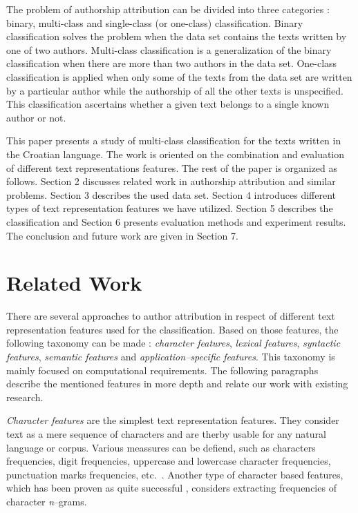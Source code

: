\documentclass{llncs}
\begin{document}
The problem of authorship attribution can be divided into three categories
\cite{zhao2005effective}: binary, multi-class and single-class (or one-class)
classification. Binary classification solves the problem when the data set
contains the texts written by one of two authors. Multi-class classification is a
generalization of the binary classification when there are more than two authors
in the data set. One-class classification is applied when only some of the texts
from the data set are written by a particular author while the authorship of all
the other texts is unspecified. This classification ascertains whether a given
text belongs to a single known author or not.

This paper presents a study of multi-class classification for the texts written
in the Croatian language. The work is oriented on the combination and evaluation of
different text representations features. The rest of the paper is organized as
follows. Section 2 discusses related work in authorship attribution and similar
problems. Section 3 describes the used data set. Section 4 introduces
different types of text representation features we have utilized. Section 5 describes
the classification and Section 6 presents evaluation methods and experiment results. The conclusion and
future work are given in Section 7.

\section{Related Work}
There are several approaches to author attribution in respect of different text
representation features used for the classification. Based on those features, the
following taxonomy can be made \cite{stamatatos2009survey}: \emph{character features},
\emph{lexical features}, \emph{syntactic features}, \emph{semantic features} and
\emph{application--specific features}. This taxonomy is mainly focused on computational requirements.
The following paragraphs describe the mentioned features in more depth and relate our work with existing research.

\emph{Character features} are the simplest text representation features. They
consider text as a mere sequence of characters and are therby usable for any natural
language or corpus. Various meassures can be defiend, such as
characters frequencies, digit frequencies, uppercase and lowercase character
frequencies, punctuation marks frequencies, etc.~\cite{de2001mining}. Another
type of character based features, which has been proven as quite successful
\cite{peng2003language,stamatatos2006ensemble}, considers extracting
frequencies of character \emph{n}--grams. 
\end{document}
